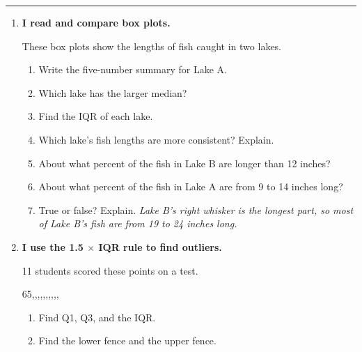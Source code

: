 \documentclass[11pt]{article}
\newcommand{\lessonhead}[1]{\par\vspace{0.6em}{\large\bfseries #1}\par\vspace{0.25em}\hrule\vspace{0.6em}}
\newcommand{\goal}[1]{\textbf{#1}\par\vspace{0.35em}}
\begin{document}
\newpage
\lessonhead{1.4 - Reading Box Plots and Outliers}
\begin{enumerate}[resume]

\item \goal{I read and compare box plots.}
These box plots show the lengths of fish caught in two lakes.
\begin{center}\end{center}
\begin{enumerate}[itemsep=1.3em]
  \item Write the five-number summary for Lake A. 
  \item Which lake has the larger median? 
  \item Find the IQR of each lake. 
  \item Which lake's fish lengths are more consistent? Explain.

  \work{3em}
  \item About what percent of the fish in Lake B are longer than 12 inches? 
  \item About what percent of the fish in Lake A are from 9 to 14 inches long? 
  \item True or false? Explain. \; \emph{Lake B's right whisker is the longest part, so most of Lake B's fish are from 19 to 24 inches long.}

  \work{4em}
\end{enumerate}

\newpage
\item \goal{I use the 1.5 $\times$ IQR rule to find outliers.}
11 students scored these points on a test.
\begin{center}65,,,,,,,,,,\end{center}
\begin{enumerate}[itemsep=1em]
  \item Find Q1, Q3, and the IQR.

  \work{4em}
  \item Find the lower fence and the upper fence.


\end{enumerate}
\end{enumerate}
\end{document}
